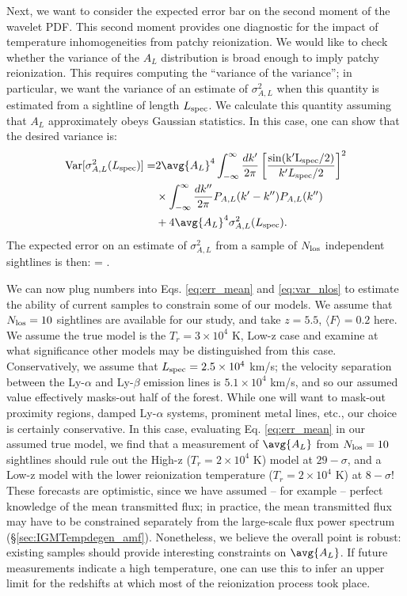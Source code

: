 Next, we want to consider the expected error bar on the second moment of the wavelet PDF. This second moment provides one
diagnostic for the impact of temperature inhomogeneities from patchy reionization. We would like to check whether
the variance of the $A_L$ distribution is broad enough to imply patchy reionization. This requires computing the
``variance of the variance''; in particular, we want the variance of an estimate of $\sigma^2_{A,L}$ when this
quantity is estimated from a sightline of length $L_{\rm spec}$. We calculate this quantity assuming that $A_L$ approximately
obeys Gaussian statistics. In this case, one can show that the desired variance is:
\begin{align}
{\rm Var}[\sigma^2_{A,L}(L_{\rm spec})] =& 2 \avg{A_L}^4 \int_{-\infty}^{\infty} \frac{dk^\prime}{2 \pi} \left[\frac{\rm{sin}(k^\prime L_{\rm spec}/2)}{k^\prime L_{\rm spec}/2} \right]^2 \nonumber \\
& \times \int_{-\infty}^{\infty} \frac{dk^{\prime \prime}}{2 \pi} P_{A,L}(k^\prime - k^{\prime \prime}) P_{A,L}(k^{\prime \prime}) \nonumber \\
& + 4 \avg{A_L}^4 \sigma^2_{A,L}(L_{\rm spec}).
\label{eq:var_al}
\end{align}
The expected error on an estimate of $\sigma^2_{A,L}$ from a sample of $N_{\rm los}$ independent sightlines is then:
\beqa
{} =  .
\label{eq:var_nlos}
\eeqa

We can now plug numbers into Eqs. \ref{eq:err_mean} and \ref{eq:var_nlos} to estimate the ability of current samples to
constrain some of our models. We assume that $N_{\rm los} = 10$ sightlines are available for our study, and take $z=5.5$, $\langle F \rangle=0.2$ 
here. We assume the true model is the $T_r = 3 \times 10^4$ K, Low-z case and examine at what significance other models
may be distinguished from this case. Conservatively, we assume that $L_{\rm spec} = 2.5 \times 10^4$ km/s; the velocity separation
between the Ly-$\alpha$ and Ly-$\beta$ emission lines is $5.1 \times 10^4$ km/s, and so our assumed value effectively 
masks-out half of the forest. While one will want to mask-out proximity regions, damped Ly-$\alpha$ systems, prominent metal lines, etc., our choice is certainly conservative. In this case, evaluating Eq. \ref{eq:err_mean} in our assumed true model, we find that a measurement
of $\avg{A_L}$ from $N_{\rm los} = 10$ sightlines should rule out the High-z ($T_r = 2 \times 10^4$ K) model at $29-\sigma$, and
a Low-z model with the lower reionization temperature ($T_r = 2 \times 10^4$ K) at $8-\sigma$! These forecasts are  
optimistic, since
we have assumed -- for example -- perfect knowledge of the mean transmitted flux; in practice, the mean transmitted flux 
may have to be constrained separately from the
large-scale flux power spectrum (\S \ref{sec:IGMTempdegen_amf}). Nonetheless, we believe the overall point is robust: existing samples should
provide interesting constraints on $\avg{A_L}$. If future measurements indicate a high temperature, one can use this to
infer an upper limit for the redshifts at which most of the reionization process took place. 

